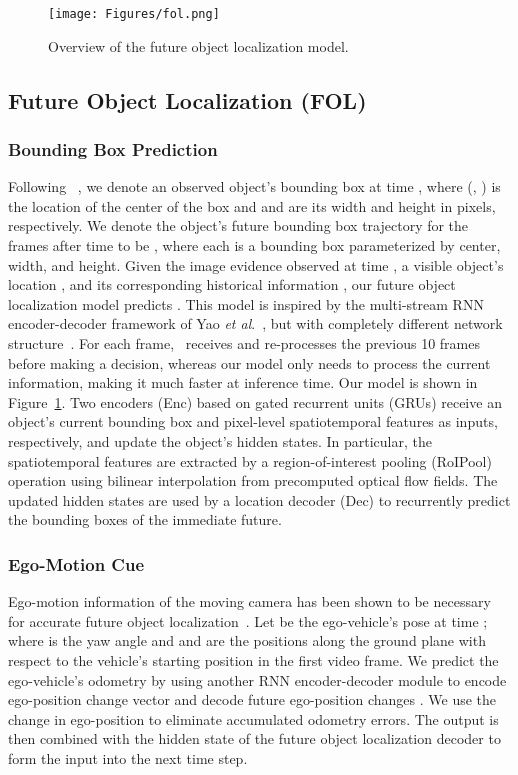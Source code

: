 \documentclass[letterpaper, 10 pt, conference]{ieeeconf}
\theoremstyle{definition}
\theoremstyle{remark}
\newcommand{\etal}{\textit{et al}.}
\begin{document}
\begin{figure}
    \vspace{5pt}
    \centering
    \texttt{[image: Figures/fol.png]}
    \caption{
        Overview of the future object localization model.
    }
    \label{fig:fol}
    \vspace{-15pt}
\end{figure}

\subsection{Future Object Localization (FOL)}

\subsubsection{Bounding Box Prediction}
Following ~\cite{yao2018egocentric}, we denote an
observed object's bounding box   at
time , where (, ) is the location of the center of
the box and  and  are its width and height in pixels,
respectively. We denote the object's future bounding box trajectory
for the  frames after time  to be
, where each
 is a bounding box parameterized by center, width, and height.
Given the image evidence  observed at time , a visible
object's location , and its corresponding historical information
, our future object localization model predicts
. This model is
inspired by the
multi-stream RNN encoder-decoder framework of Yao
\etal~\cite{yao2018egocentric}, but with completely different network
structure~\cite{xu2018temporal}.
For each frame,~\cite{yao2018egocentric} receives and
re-processes the previous 10 frames
before making a decision, whereas
our model only needs to process the current information, making it
much faster at inference time. Our model is shown in 
Figure~\ref{fig:fol}.
Two encoders (Enc) based on gated recurrent units (GRUs) receive
an object's current bounding box and pixel-level spatiotemporal
features as inputs, respectively, and update the object's hidden
states. In particular, the spatiotemporal 
features are extracted by a
region-of-interest pooling (RoIPool) operation using bilinear
interpolation from precomputed optical flow fields. 
The updated hidden states are used by a
location decoder (Dec) to recurrently predict the bounding boxes
of the immediate future.

\subsubsection{Ego-Motion Cue}
Ego-motion information of the moving camera has been shown
to be necessary for accurate future object localization~\cite{yao2018egocentric,Bhattacharyya_2018_CVPR}.
Let  be the ego-vehicle's pose at time ;
 where  is the yaw angle and 
and  are the positions along the ground plane with respect to the
vehicle's starting position in the first video frame.
We predict the ego-vehicle's odometry by using another RNN 
encoder-decoder module to encode  ego-position
change vector  and decode future ego-position changes
.
We use the change in ego-position 
to eliminate accumulated odometry errors. 
The output  is then combined with the hidden state of the
future object localization decoder to form the input into the next time step.
\end{document}

